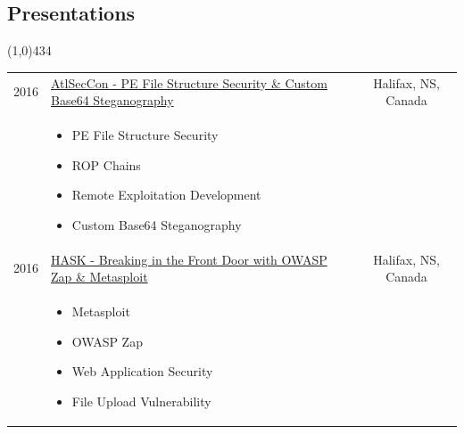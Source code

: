 \documentclass{res}
\newcommand{\frstCVcell}{2.5cm}
\begin{document}
\begin{resume}
  \pagebreak
  \section{Presentations}
  \line(1,0){434}
  \newline
  \newline
  \begin{tabularx}{\textwidth}{p{\frstCVcell}Xc}
    2016 & \href{https://speakerdeck.com/lillypad/pe-file-structure-security-and-custom-base-64-steganography}{AtlSecCon - PE File Structure Security \& Custom Base64 Steganography} & Halifax, NS, Canada\\
    &
    \begin{itemize}
    \item PE File Structure Security
    \item ROP Chains
    \item Remote Exploitation Development
    \item Custom Base64 Steganography
    \end{itemize}
    & \\
    2016 & \href{https://speakerdeck.com/lillypad/breaking-in-the-front-door-with-owasp-zap-and-metasploit}{HASK - Breaking in the Front Door with OWASP Zap \& Metasploit} & Halifax, NS, Canada\\
    &
    \begin{itemize}
    \item Metasploit
    \item OWASP Zap
    \item Web Application Security
    \item File Upload Vulnerability
    \end{itemize}
    & \\
  \end{tabularx}
  
  \pagebreak

\end{resume}
\end{document}
